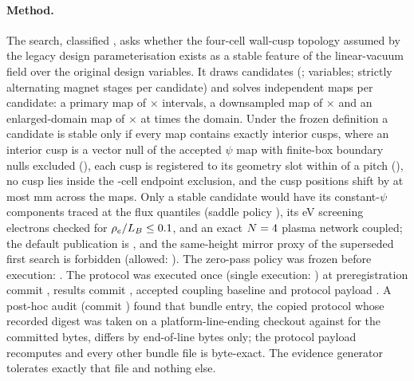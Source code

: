 \paragraph{Method.}
The search, classified \texttt{\FcnClassification}, asks whether the four-cell
wall-cusp topology assumed by the legacy design parameterisation exists as a
stable feature of the linear-vacuum \FcnFieldModelLevel{} field over the
original design variables. It draws
\FcnCandidateCount{} candidates (\FcnSamplingAlgorithm; \FcnDesignVariableCount{}
variables; \FcnStageCount{} strictly alternating magnet stages per candidate) and
solves \FcnMapCount{} independent maps per candidate: a primary map of
\FcnPrimaryRadial$\times$\FcnPrimaryAxial{} intervals, a downsampled map of
\FcnDownsampledRadial$\times$\FcnDownsampledAxial{} and an enlarged-domain map of
\FcnEnlargedRadial$\times$\FcnEnlargedAxial{} at \FcnEnlargedScale{} times the domain.
Under the frozen definition a candidate is stable only if every map contains
exactly \FcnRequiredCells{} interior cusps, where an interior cusp is a vector null
of the accepted $\psi$ map with finite-box boundary nulls excluded
(\FcnBoundaryNullPolicy), each cusp is registered to its geometry slot within
\FcnSlotErrorFraction{} of a pitch (\FcnCuspSlots), no cusp lies inside the
\FcnEndpointExclusionCells-cell endpoint exclusion, and the cusp positions shift
by at most \FcnMaxCuspShiftMm{} mm across the maps. Only a stable candidate would
have its constant-$\psi$ components traced at the flux quantiles
\FcnFluxQuantiles{} (saddle policy \texttt{\FcnSaddlePolicy}), its
\FcnElectronEnergyEv{} eV screening electrons checked for
$\rho_e/L_B \le 0.1$, and an exact $N=4$ plasma network
coupled; the default publication is \FcnDefaultPublication, and the same-height
mirror proxy of the superseded first search is forbidden (allowed:
\FcnSameZProxyAllowed). The zero-pass policy was frozen before execution:
\FcnZeroPassPolicy. The protocol was executed once (single execution:
\FcnSingleExecution) at preregistration commit \texttt{\FcnPreregCommit}, results
commit \texttt{\FcnResultsCommit}, accepted coupling baseline
\texttt{\FcnCouplingCommit} and protocol payload \texttt{\FcnProtocolPayloadSha}. A
post-hoc audit (commit \texttt{\FcnAuditCommit}) found that \FcnToleratedEolFiles{}
bundle entry, the copied protocol whose recorded digest \texttt{\FcnProtocolRecordedSha}
was taken on a platform-line-ending checkout against \texttt{\FcnProtocolLfSha}
for the committed bytes, differs by end-of-line bytes only; the protocol payload
recomputes and every other bundle file is byte-exact. The evidence generator
tolerates exactly that file and nothing else.

